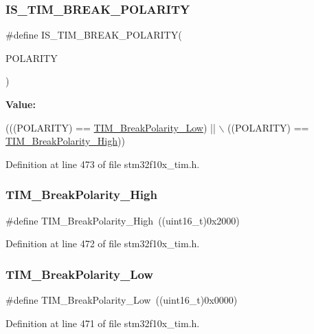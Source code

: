 \subsubsection{\texorpdfstring{I\+S\+\_\+\+T\+I\+M\+\_\+\+B\+R\+E\+A\+K\+\_\+\+P\+O\+L\+A\+R\+I\+TY}{IS\_TIM\_BREAK\_POLARITY}}
{\footnotesize\ttfamily \#define I\+S\+\_\+\+T\+I\+M\+\_\+\+B\+R\+E\+A\+K\+\_\+\+P\+O\+L\+A\+R\+I\+TY(\begin{DoxyParamCaption}\item[{}]{P\+O\+L\+A\+R\+I\+TY }\end{DoxyParamCaption})}

{\bfseries Value\+:}
\begin{DoxyCode}
(((POLARITY) == \hyperlink{group___break___polarity_ga565656ca81d17f9a1807afe3971dff6e}{TIM\_BreakPolarity\_Low}) || \(\backslash\)
                                         ((POLARITY) == \hyperlink{group___break___polarity_gabd4b72079548fd8903413a348539542b}{TIM\_BreakPolarity\_High}))
\end{DoxyCode}


Definition at line 473 of file stm32f10x\+\_\+tim.\+h.

\mbox{\label{group___break___polarity_gabd4b72079548fd8903413a348539542b}} 
\subsubsection{\texorpdfstring{T\+I\+M\+\_\+\+Break\+Polarity\+\_\+\+High}{TIM\_BreakPolarity\_High}}
{\footnotesize\ttfamily \#define T\+I\+M\+\_\+\+Break\+Polarity\+\_\+\+High~((uint16\+\_\+t)0x2000)}



Definition at line 472 of file stm32f10x\+\_\+tim.\+h.

\mbox{\label{group___break___polarity_ga565656ca81d17f9a1807afe3971dff6e}} 
\subsubsection{\texorpdfstring{T\+I\+M\+\_\+\+Break\+Polarity\+\_\+\+Low}{TIM\_BreakPolarity\_Low}}
{\footnotesize\ttfamily \#define T\+I\+M\+\_\+\+Break\+Polarity\+\_\+\+Low~((uint16\+\_\+t)0x0000)}



Definition at line 471 of file stm32f10x\+\_\+tim.\+h.

